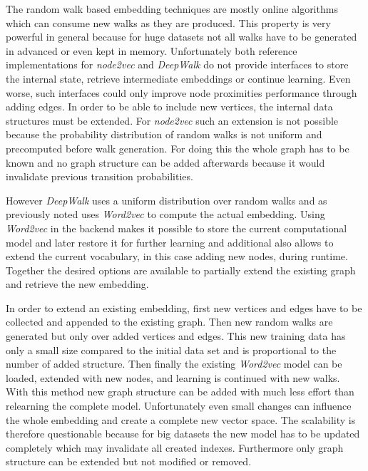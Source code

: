 \documentclass[a4paper]{llncs}
\begin{document}
	The random walk based embedding techniques are mostly online algorithms which can consume new walks as they are produced. This property is very powerful in general because for huge datasets not all walks have to be generated in advanced or even kept in memory. Unfortunately both reference implementations for \emph{node2vec} and \emph{DeepWalk} do not provide interfaces to store the internal state, retrieve intermediate embeddings or continue learning. Even worse, such interfaces could only improve node proximities performance through adding edges. In order to be able to include new vertices, the internal data structures must be extended. For \emph{node2vec} such an extension is not possible because the probability distribution of random walks is not uniform and precomputed before walk generation. For doing this the whole graph has to be known and no graph structure can be added afterwards because it would invalidate previous transition probabilities.
	
	However \emph{DeepWalk} uses a uniform distribution over random walks and as previously noted uses \emph{Word2vec} to compute the actual embedding. Using  \emph{Word2vec} in the backend makes it possible to store the current computational model and later restore it for further learning and additional also allows to extend the current vocabulary, in this case adding new nodes, during runtime. Together the desired options are available to partially extend the existing graph and retrieve the new embedding.
	
	In order to extend an existing embedding, first new vertices and edges have to be collected and appended to the existing graph. Then new random walks are generated but only over added vertices and edges. This new training data has only a small size compared to the initial data set and is proportional to the number of added structure. Then finally the existing \emph{Word2vec} model can be loaded, extended with new nodes, and learning is continued with new walks. \\
	
	
	With this method new graph structure can be added with much less effort than relearning the complete model. Unfortunately even small changes can influence the whole embedding and create a complete new vector space. The scalability is therefore questionable because for big datasets the new model has to be updated completely which may invalidate all created indexes. Furthermore only graph structure can be extended but not modified or removed.
	
\end{document}
